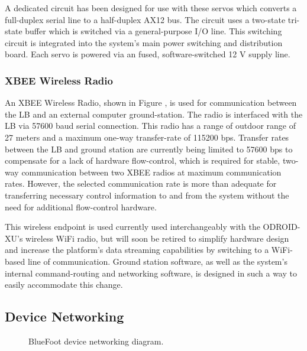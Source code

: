 				A dedicated circuit has been designed for use with these servos which converts a full-duplex serial line to a half-duplex AX12 bus. The circuit uses a two-state tri-state buffer which is switched via a general-purpose I/O line. This switching circuit is integrated into the system's main power switching and distribution board. Each servo is powered via an fused, software-switched 12 V supply line.

			\subsubsection{XBEE Wireless Radio}

				An XBEE Wireless Radio, shown in Figure , is used for communication between the LB and an external computer ground-station. The radio is interfaced with the LB via 57600 baud serial connection. This radio has a range of outdoor range of 27 meters and a maximum one-way transfer-rate of 115200 bps. Transfer rates between the LB and ground station are currently being limited to 57600 bps to compensate for a lack of hardware flow-control, which is required for stable, two-way communication between two XBEE radios at maximum communication rates. However, the selected communication rate is more than adequate for transferring necessary control information to and from the system without the need for additional flow-control hardware.

				This wireless endpoint is used currently used interchangeably with the ODROID-XU's wireless WiFi radio, but will soon be retired to simplify hardware design and increase the platform's data streaming capabilities by switching to a WiFi-based line of communication. Ground station software, as well as the system's internal command-routing and networking software, is designed in such a way to easily accommodate this change.

		\subsection{Device Networking}

			\begin{figure}[h!]
				\centering
				\caption{BlueFoot device networking diagram.}
				\label{fig::dev_diagram}
			\end{figure}
			
